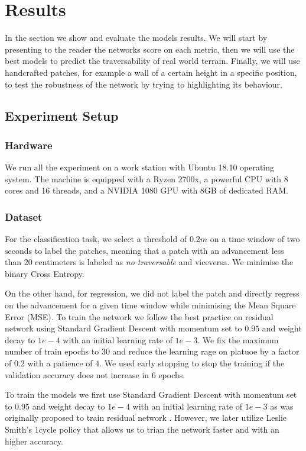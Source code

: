 \documentclass[../document.tex]{subfiles}
\begin{document}
\section{Results}
In the section we show and evaluate the models results. We will start by presenting to the reader the networks score on each metric, then we will use the best models to predict the traversability of real world terrain. Finally, we will use handcrafted patches, for example a wall of a certain height in a specific position, to test the robustness of the network by trying to highlighting its behaviour.
\subsection{Experiment Setup}
\subsubsection{Hardware}
We run all the experiment on a work station with Ubuntu 18.10 operating system. The machine is equipped with a Ryzen 2700x, a powerful CPU with 8 cores and 16 threads, and a NVIDIA 1080 GPU with 8GB of dedicated RAM.
\subsubsection{Dataset}
For the classification task, we select a threshold of $0.2m$ on a time window of two seconds to label the patches, meaning that a patch with an advancement less than $20$ centimeters is labeled as \emph{no traversable} and viceversa. We minimise the binary Cross Entropy. 

On the other hand, for regression, we did not label the patch and directly regress on the advancement for a given time window while minimising the Mean Square Error (MSE). 
To train the network we follow the best practice on residual network \cite{he2015deep} using Standard Gradient Descent with momentum set to $0.95$ and weight decay to $1e-4$ with an initial learning rate of $1e-3$.
We fix the maximum number of train epochs to $30$ and reduce the learning rage on platuoe  by a factor of $0.2$ with a patience of $4$. We used early stopping to stop the training if the validation accuracy does not increase in $6$ epochs.

To train the models we first use Standard Gradient Descent with momentum set to $0.95$ and weight decay to $1e-4$ with an initial learning rate of $1e-3$ as was originally proposed to train residual network \cite{he2015deep}. However, we later utilize Leslie Smith's 1cycle policy \cite{1cycle} that allows us to trian the network faster and with an higher accuracy.
\end{document}
